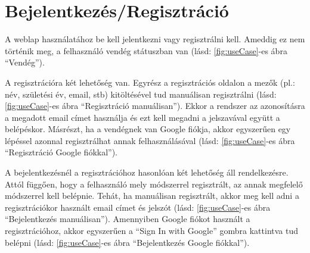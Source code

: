 \documentclass[12pt]{report}
\theoremstyle{definition}
\begin{document}
\section{Bejelentkezés/Regisztráció}
A weblap használatához be kell jelentkezni vagy regisztrálni kell. Ameddig ez nem történik meg, a felhasználó vendég státuszban van (lásd: \ref{fig:useCase}-es ábra “Vendég”). 

A regisztrációra két lehetőség van. Egyrész a regisztrációs oldalon a mezők (pl.: név, születési év, email, stb) kitöltésével tud manuálisan regisztrálni (lásd: \ref{fig:useCase}-es ábra “Regisztráció manuálisan”). Ekkor a rendszer az azonosításra a megadott email címet használja és ezt kell megadni a jelszavával együtt a belépéskor. Másrészt, ha a vendégnek van Google fiókja, akkor egyszerűen egy lépéssel azonnal regisztrálhat annak felhasználásával (lásd: \ref{fig:useCase}-es ábra “Regisztráció Google fiókkal”).

A bejelentkezésnél a regisztrációhoz hasonlóan két lehetőség áll rendelkezésre. Attól függően, hogy a felhasználó mely módszerrel regisztrált, az annak megfelelő módszerrel kell belépnie. Tehát, ha manuálisan regisztrált, akkor meg kell adni a regisztrációkor használt email címet és jelszót (lásd: \ref{fig:useCase}-es ábra “Bejelentkezés manuálisan”). Amennyiben Google fiókot használt a regisztrációhoz, akkor egyszerűen a “Sign In with Google” gombra kattintva tud belépni (lásd: \ref{fig:useCase}-es ábra “Bejelentkezés Google fiókkal”).
 
\end{document}
